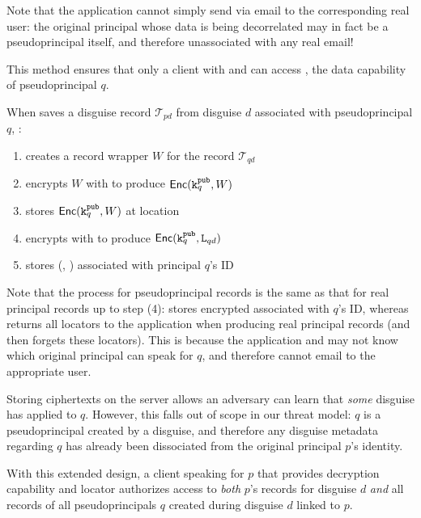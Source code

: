 Note that the application cannot simply send  via \eg email to the corresponding
real user: the original principal whose data is being decorrelated may in fact be a pseudoprincipal
itself, and therefore unassociated with any real email!

This method ensures that only a client with  and  can access , the data
capability of pseudoprincipal $q$. 

When \sys saves a disguise record $\mathcal{T}_{pd}$ from disguise $d$ associated with pseudoprincipal $q$, \sys:
\begin{enumerate}
    \item creates a record wrapper $W$ for the record $\mathcal{T}_{qd}$
    \item encrypts $W$ with  to produce $\mathsf{Enc}(\texttt{\ensuremath{\texttt{k}^{\text{pub}}_{q}}}, W)$
    \item stores $\mathsf{Enc}(\texttt{\ensuremath{\texttt{k}^{\text{pub}}_{q}}}, W)$ at location 
    \item encrypts  with  to produce $\mathsf{Enc}(\texttt{\ensuremath{\texttt{k}^{\text{pub}}_{q}}}, \texttt{L}_{qd})$
    \item stores \enc(, ) associated with principal $q$'s ID
\end{enumerate}
Note that the process for pseudoprincipal records is the same as that for real principal records up to
step (4): \sys stores encrypted  associated with $q$'s ID, whereas \sys returns all locators to
the application when producing real principal records (and then forgets these locators).
This is because the application and \sys may not know which original principal can speak for $q$,
and therefore cannot \eg email  to the appropriate user.

Storing  ciphertexts on the server allows an adversary can learn that \emph{some} disguise has
applied to $q$. However, this falls out of scope in our threat model: $q$ is a pseudoprincipal
created by a disguise, and therefore any disguise metadata regarding $q$ has already been
dissociated from the original principal $p$'s identity.

With this extended design, a client speaking for $p$ that provides decryption capability 
and locator  authorizes access to \emph{both} $p$'s records for disguise $d$ \emph{and} all
records of all pseudoprincipals $q$ created during disguise $d$ linked to $p$.

